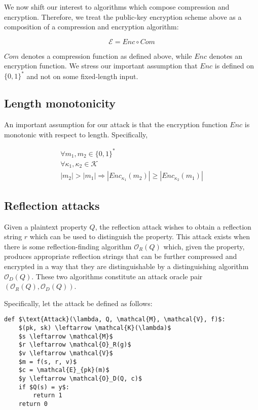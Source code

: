 \documentclass{article}
\begin{document}
We now shift our interest to algorithms which compose compression and
encryption.  Therefore, we treat the public-key encryption scheme above as a
composition of a compression and encryption algorithm:

\begin{equation*}
    \mathcal{E} = Enc \circ Com
\end{equation*}

$Com$ denotes a compression function as defined above, while $Enc$ denotes an
encryption function. We stress our important assumption that $Enc$ is defined
on $\{0, 1\}^*$ and not on some fixed-length input.

\subsection*{Length monotonicity}

An important assumption for our attack is that the encryption function $Enc$ is
monotonic with respect to length. Specifically,

\begin{equation*}
\begin{split}
\forall m_1, m_2 \in \{0, 1\}^*\\
\forall \kappa_1, \kappa_2 \in \mathcal{K}\\
|m_2| > |m_1|
\Rightarrow
|Enc_{\kappa_1}(m_2)| \geq |Enc_{\kappa_2}(m_1)|
\end{split}
\end{equation*}

\subsection*{Reflection attacks}

Given a plaintext property $Q$, the reflection attack wishes to obtain a
reflection string $r$ which can be used to distinguish the property. This
attack exists when there is some reflection-finding algorithm
$\mathcal{O}_R(Q)$ which, given the property,
produces appropriate reflection strings that can be further compressed and
encrypted in a way that they are distinguishable by a distinguishing algorithm
$\mathcal{O}_D(Q)$.  These two algorithms constitute an attack oracle pair
$(\mathcal{O}_R(Q), \mathcal{O}_D(Q))$.

Specifically, let the attack be defined as follows:

\begin{lstlisting}[texcl,mathescape]
def $\text{Attack}(\lambda, Q, \mathcal{M}, \mathcal{V}, f)$:
    $(pk, sk) \leftarrow \mathcal{K}(\lambda)$
    $s \leftarrow \mathcal{M}$
    $r \leftarrow \mathcal{O}_R(g)$
    $v \leftarrow \mathcal{V}$
    $m = f(s, r, v)$
    $c = \mathcal{E}_{pk}(m)$
    $y \leftarrow \mathcal{O}_D(Q, c)$
    if $Q(s) = y$:
        return 1
    return 0
\end{lstlisting}
\end{document}
